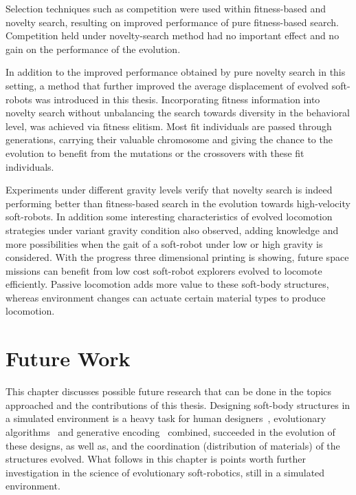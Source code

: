 Selection techniques such as competition were used within fitness-based and novelty search, resulting on improved performance of pure fitness-based search. Competition held under novelty-search method had no important effect and no gain on the performance of the evolution. 

In addition to the improved performance obtained by pure novelty search in this setting, a method that further improved the average displacement of evolved soft-robots was introduced in this thesis. Incorporating fitness information into novelty search without unbalancing the search towards diversity in the behavioral level, was achieved via fitness elitism. Most fit individuals are passed through generations, carrying their valuable chromosome and giving the chance to the evolution to benefit from the mutations or the crossovers with these fit individuals.

Experiments under different gravity levels verify that novelty search is indeed performing better than fitness-based search in the evolution towards high-velocity soft-robots. In addition some interesting characteristics of evolved locomotion strategies under variant gravity condition also observed, adding knowledge and more possibilities when the gait of a soft-robot under low or high gravity is considered. With the progress three dimensional printing is showing, future space missions can benefit from low cost soft-robot explorers evolved to locomote efficiently. Passive locomotion adds more value to these soft-body structures, whereas environment changes can actuate certain material types to produce locomotion.

\section{Future Work} %

This chapter discusses possible future research that can be done in the topics approached and the contributions of this thesis. Designing soft-body structures in a simulated environment is a heavy task for human designers~\citep{cheney2013unshackling}, evolutionary algorithms~\citep{stanley2002evolving} and generative encoding~\citep{stanley2007compositional} combined, succeeded in the evolution of these designs, as well as, and the coordination (distribution of materials) of the structures evolved. What follows in this chapter is points worth further investigation in the science of evolutionary soft-robotics, still in a simulated environment.


